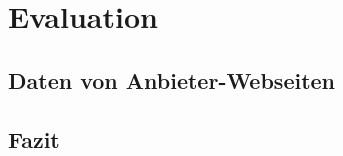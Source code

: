 \section{Evaluation}\label{sec:Evaluation}
\subsection{Daten von Anbieter-Webseiten}
\subsection{Fazit}